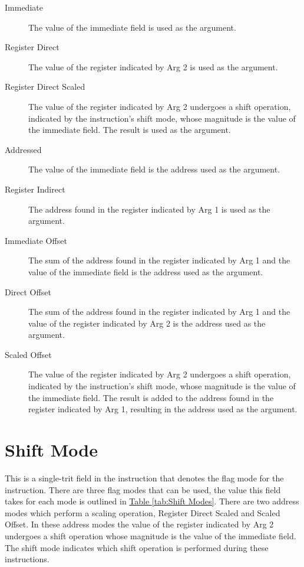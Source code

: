 \documentclass[12pt]{article}
\begin{document}
\begin{description}
\item[Immediate] The value of the immediate field is used as the argument.
\item[Register Direct] The value of the register indicated by Arg 2 is used as the argument.
\item[Register Direct Scaled] The value of the register indicated by Arg 2 undergoes a shift
operation, indicated by the instruction's shift mode, whose magnitude is the value of the
immediate field. The result is used as the argument.
\item[Addressed] The value of the immediate field is the address used as the argument.
\item[Register Indirect] The address found in the register indicated by Arg 1 is used as the
argument.
\item[Immediate Offset] The sum of the address found in the register indicated by Arg 1 and
the value of the immediate field is the address used as the argument.
\item[Direct Offset] The sum of the address found in the register indicated by Arg 1 and the
value of the register indicated by Arg 2 is the address used as the argument.
\item[Scaled Offset] The value of the register indicated by Arg 2 undergoes a shift operation,
indicated by the instruction's shift mode, whose magnitude is the value of the immediate field.
The result is added to the address found in the register indicated by Arg 1, resulting in the
address used as the argument.
\end{description}

\section{Shift Mode} \label{sec:Shift Mode}

This is a single-trit field in the instruction that denotes the flag mode for the instruction.
There are three flag modes that can be used, the value this field takes for each mode is
outlined in \hyperref[tab:Shift Modes]{Table \ref{tab:Shift Modes}}. There are two address
modes which perform a scaling operation, Register Direct Scaled and Scaled Offset. In these
address modes the value of the register indicated by Arg 2 undergoes a shift operation whose
magnitude is the value of the immediate field. The shift mode indicates which shift operation
is performed during these instructions.
\end{document}
